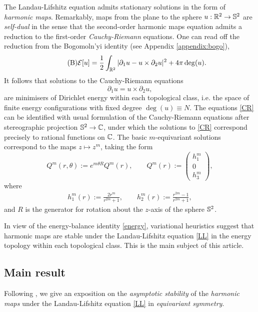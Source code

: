 The Landau-Lifshitz equation admits stationary solutions in the form of \textit{harmonic maps}. Remarkably, maps from the plane to the sphere $u : \mathbb R^2 \to \mathbb S^2$ are \textit{self-dual} in the sense that the second-order harmonic maps equation admits a reduction to the first-order \textit{Cauchy-Riemann} equations. One can read off the reduction from the Bogomoln'yi identity (see Appendix \ref{appendix:bogo}),
\begin{equation}\tag{B}\label{eq:B}
	\mathcal E[u]
		= \frac12 \int_{\mathbb R^2} |\partial_1 u - u \times \partial_2 u|^2 + 4\pi \deg(u).
\end{equation}
It follows that solutions to the Cauchy-Riemann equations 
	\begin{equation}\tag{HM}\label{eq:CR}
		\partial_1 u = u \times \partial_2 u,
	\end{equation}
are minimisers of Dirichlet energy within each topological class, i.e. the space of finite energy configurations with fixed degree $\deg(u) \equiv N$. The equations \eqref{CR} can be identified with usual formulation of the Cauchy-Riemann equations after stereographic projection $\mathbb S^2 \to \mathbb C$, under which the solutions to \eqref{CR} correspond precisely to rational functions on $\mathbb C$. The basic $m$-equivariant solutions correspond to the maps $z \mapsto z^m$, taking the form 
\[
	Q^m (r, \theta) 
		:= e^{m \theta R} Q^m(r), 
		\qquad 
	Q^m (r) 
		:= 
			\begin{pmatrix} 
				h_1^m\\
				0\\
				h_3^m
			\end{pmatrix},
\]
where 
\begin{align*}
	h^m_1 (r) 
		:= \frac{2r^m}{r^{2m} + 1}, \qquad
	h^m_2 (r) 
		:= \frac{r^{2m} - 1}{r^{2m} + 1},
\end{align*}
and $R$ is the generator for rotation about the $z$-axis of the sphere $\mathbb S^2$. 

In view of the energy-balance identity \eqref{energy}, variational heuristics suggest that harmonic maps are stable under the Landau-Lifshitz equation \eqref{LL} in the energy topology within each topological class. This is the main subject of this article. 

\subsection{Main result}

Following \cite{GustafsonEtAl2010}, we give an exposition on the \textit{asymptotic stability} of the \textit{harmonic maps} under the Landau-Lifshitz equation \eqref{LL} in \textit{equivariant symmetry}. 

